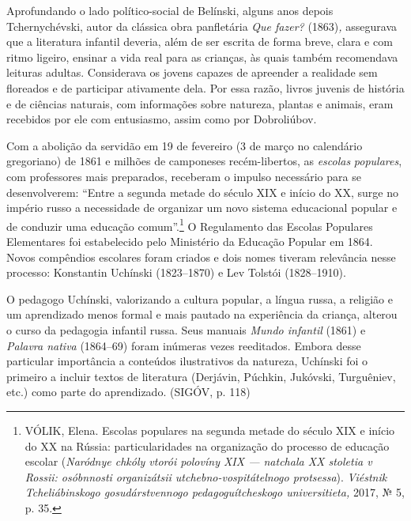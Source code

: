 Aprofundando o lado político-social de Belínski, alguns anos depois
Tchernychévski, autor da clássica obra panfletária \emph{Que fazer?}
(1863)\emph{,} assegurava que a literatura infantil deveria, além de ser
escrita de forma breve, clara e com ritmo ligeiro, ensinar a vida real
para as crianças, às quais também recomendava leituras adultas.
Considerava os jovens capazes de apreender a realidade sem floreados e
de participar ativamente dela. Por essa razão, livros juvenis de
história e de ciências naturais, com informações sobre natureza, plantas
e animais, eram recebidos por ele com entusiasmo, assim como por
Dobroliúbov.

Com a abolição da servidão em 19 de fevereiro (3 de março no calendário
gregoriano) de 1861 e milhões de camponeses recém-libertos, as
\emph{escolas} \emph{populares}, com professores mais preparados,
receberam o impulso necessário para se desenvolverem: ``Entre a segunda
metade do século XIX e início do XX, surge no império russo a
necessidade de organizar um novo sistema educacional popular e de
conduzir uma educação comum''.\footnote{VÓLIK, Elena. Escolas populares
  na segunda metade do século XIX e início do XX na Rússia:
  particularidades na organização do processo de educação escolar
  (\emph{Naródnye chkóly vtorói polovíny XIX --- natchala XX stoletia v
  Rossii: osóbnnosti organizátsii utchebno-vospitátelnogo protsessa}).
  \emph{Viéstnik Tcheliábinskogo gosudárstvennogo pedagoguítcheskogo
  universitieta,} 2017, № 5, p. 35.} O Regulamento das Escolas Populares
Elementares foi estabelecido pelo Ministério da Educação Popular em
1864. Novos compêndios escolares foram criados e dois nomes tiveram
relevância nesse processo: Konstantin Uchínski (1823--1870) e Lev
Tolstói (1828--1910).

O pedagogo Uchínski, valorizando a cultura popular, a língua russa, a
religião e um aprendizado menos formal e mais pautado na experiência da
criança, alterou o curso da pedagogia infantil russa. Seus manuais
\emph{Mundo infantil} (1861) e \emph{Palavra nativa} (1864--69) foram
inúmeras vezes reeditados. Embora desse particular importância a
conteúdos ilustrativos da natureza, Uchínski foi o primeiro a incluir
textos de literatura (Derjávin, Púchkin, Jukóvski, Turguêniev, etc.)
como parte do aprendizado. (SIGÓV, p. 118)


